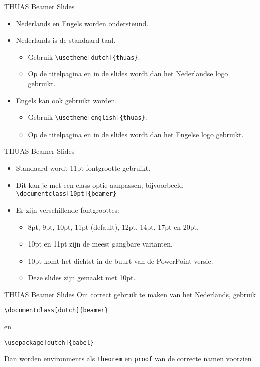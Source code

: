 \documentclass[fleqn,aspectratio=169,dutch,10pt]{beamer}
\begin{document}
\begin{frame}[fragile]{THUAS Beamer Slides}
\begin{itemize}
\item Nederlands en Engels worden ondersteund.
\item Nederlands is de standaard taal.
\begin{itemize}
\item Gebruik \lstinline|\usetheme[dutch]{thuas}|.
\item Op de titelpagina en in de slides wordt dan het Nederlandse logo gebruikt.
\end{itemize}
\item Engels kan ook gebruikt worden.
\begin{itemize}
\item Gebruik \lstinline|\usetheme[english]{thuas}|.
\item Op de titelpagina en in de slides wordt dan het Engelse logo gebruikt.
\end{itemize}
\end{itemize}
\end{frame}

\begin{frame}[fragile]{THUAS Beamer Slides}
\begin{itemize}
\item Standaard wordt 11pt fontgrootte gebruikt.
\item Dit kan je met een class optie aanpassen, bijvoorbeeld \lstinline|\documentclass[10pt]{beamer}|
\item Er zijn verschillende fontgroottes: 
\begin{itemize}
\item 8pt, 9pt, 10pt, 11pt (default), 12pt, 14pt, 17pt en 20pt.
\item 10pt en 11pt zijn de meest gangbare varianten.
\item 10pt komt het dichtst in de buurt van de PowerPoint-versie.
\item Deze slides zijn gemaakt met 10pt.
\end{itemize}
\end{itemize}
\end{frame}

\begin{frame}[fragile]{THUAS Beamer Slides}
Om correct gebruik te maken van het Nederlands, gebruik
\begin{lstlisting}
\documentclass[dutch]{beamer}
\end{lstlisting}
en
\begin{lstlisting}
\usepackage[dutch]{babel}
\end{lstlisting}
Dan worden environments als \lstinline|theorem| en \lstinline|proof| van de correcte namen voorzien

\end{frame}
\end{document}
